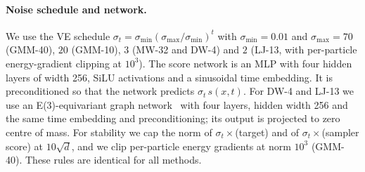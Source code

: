 \paragraph{Noise schedule and network.}
We use the VE schedule $\sigma_t=\sigma_{\min}(\sigma_{\max}/\sigma_{\min})^t$ with $\sigma_{\min}=0.01$ and $\sigma_{\max}=70$ (GMM-40), $20$ (GMM-10), $3$ (MW-32 and DW-4) and $2$ (LJ-13, with per-particle energy-gradient clipping at $10^3$).
The score network is an MLP with four hidden layers of width 256, SiLU activations and a sinusoidal time embedding. It is preconditioned so that the network predicts $\sigma_t\,s(x,t)$. For DW-4 and LJ-13 we use an E(3)-equivariant graph network~\citep{satorras2021en} with four layers, hidden width 256 and the same time embedding and preconditioning; its output is projected to zero centre of mass.
For stability we cap the norm of $\sigma_t\times$(target) and of $\sigma_t\times$(sampler score) at $10\sqrt d$, and we clip per-particle energy gradients at norm $10^3$ (GMM-40). These rules are identical for all methods.

